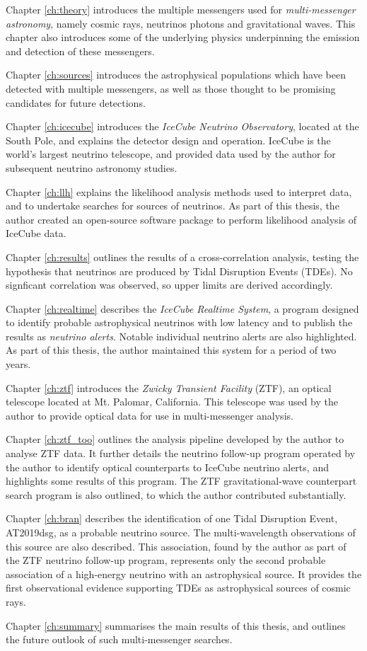 Chapter \ref{ch:theory} introduces the multiple messengers used for \emph{multi-messenger astronomy}, namely cosmic rays, neutrinos photons and gravitational waves. This chapter also introduces some of the underlying physics underpinning the emission and detection of these messengers. 

Chapter \ref{ch:sources} introduces the astrophysical populations which have been detected with multiple messengers, as well as those thought to be promising candidates for future detections.

Chapter \ref{ch:icecube} introduces the \emph{IceCube Neutrino Observatory}, located at the South Pole, and explains the detector design and operation. IceCube is the world's largest neutrino telescope, and provided data used by the author for subsequent neutrino astronomy studies.

Chapter \ref{ch:llh} explains the likelihood analysis methods used to interpret data, and to undertake searches for sources of neutrinos. As part of this thesis, the author created an open-source software package to perform likelihood analysis of IceCube data.

Chapter \ref{ch:results} outlines the results of a cross-correlation analysis, testing the hypothesis that neutrinos are produced by Tidal Disruption Events (TDEs). No signficant correlation was observed, so upper limits are derived accordingly.

Chapter \ref{ch:realtime} describes the \emph{IceCube Realtime System}, a program designed to identify probable astrophysical neutrinos with low latency and to publish the results as \emph{neutrino alerts}. Notable individual neutrino alerts are also highlighted. As part of this thesis, the author maintained this system for a period of two years. 

Chapter \ref{ch:ztf} introduces the \emph{Zwicky Transient Facility} (ZTF), an optical telescope located at Mt. Palomar, California. This telescope was used by the author to provide optical data for use in multi-messenger analysis.

Chapter \ref{ch:ztf_too} outlines the analysis pipeline developed by the author to analyse ZTF data. It further details the neutrino follow-up program operated by the author to identify optical counterparts to IceCube neutrino alerts, and highlights some results of this program. The ZTF gravitational-wave counterpart search program is also outlined, to which the author contributed substantially.

Chapter \ref{ch:bran} describes the identification of one Tidal Disruption Event, AT2019dsg, as a probable neutrino source. The multi-wavelength observations of this source are also described. This association, found by the author as part of the ZTF neutrino follow-up program, represents only the second probable association of a high-energy neutrino with an astrophysical source. It provides the first observational evidence supporting TDEs as astrophysical sources of cosmic rays.

Chapter \ref{ch:summary} summarises the main results of this thesis, and outlines the future outlook of such multi-messenger searches.



